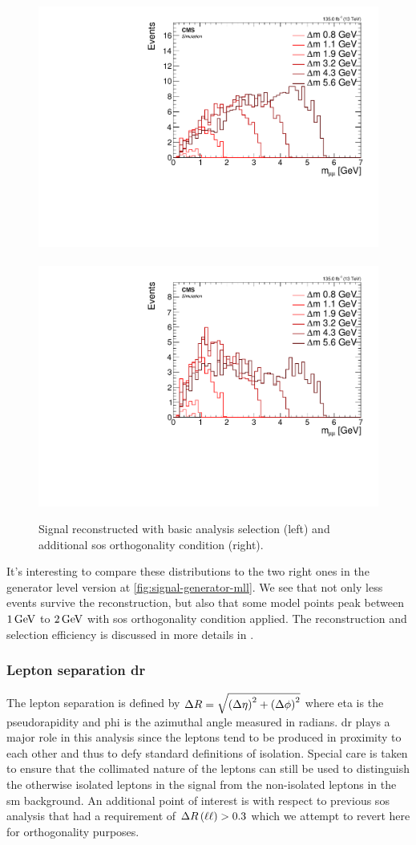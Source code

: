 \begin{figure}[!htb]
\centering
\includegraphics[width=0.48\linewidth]{plots/signal_muons/none_invMassCorrJetNoMultIso10Dr0.6.pdf} \,
\includegraphics[width=0.48\linewidth]{plots/signal_muons/none_invMassCorrJetNoMultIso10Dr0.6_orth.pdf}  \\
\caption[Signal reconstructed \mmumu]{ Signal reconstructed \mmumu with basic analysis selection (left) and additional \gls{sos} orthogonality condition (right).}
\label{fig:reco-signal-invamass}
\end{figure}

It's interesting to compare these distributions to the two right ones in the generator level version at \ref{fig:signal-generator-mll}. We see that not only less events survive the reconstruction, but also that some \dm model points peak between $1 \,\text{Ge\hspace{-.08em}V}$ to $2 \,\text{Ge\hspace{-.08em}V}$ with \gls{sos} orthogonality condition applied. The reconstruction and selection efficiency is discussed in more details in .

\subsubsection{Lepton separation \gls{dr}}
\label{sec:lepton-dr}

The lepton separation is defined by $\Delta R=\sqrt{\left(\Delta\eta\right)^2+\left(\Delta\phi\right)^2}$ where \gls{eta} is the pseudorapidity and \gls{phi} is the azimuthal angle measured in radians. \gls{dr} plays a major role in this analysis since the leptons tend to be produced in proximity to each other and thus to defy standard definitions of isolation. Special care is taken to ensure that the collimated nature of the leptons can still be used to distinguish the otherwise isolated leptons in the signal from the non-isolated leptons in the \gls{sm} background. An additional point of interest is with respect to previous \gls{sos} analysis  that had a requirement of $\Delta R\left(\ell\ell\right) > 0.3$ which we attempt to revert here for orthogonality purposes. 

